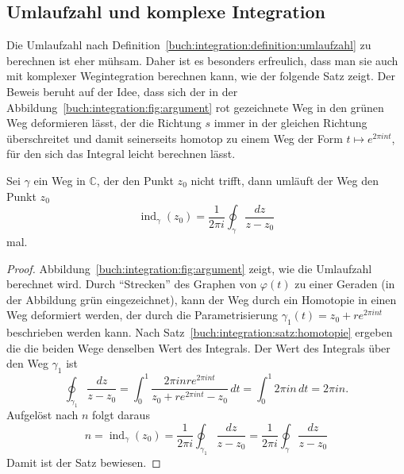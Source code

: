 %
%
%
\subsection{Umlaufzahl und komplexe Integration}
Die Umlaufzahl 
nach Definition~\ref{buch:integration:definition:umlaufzahl}
zu berechnen ist eher mühsam.
Daher ist es besonders erfreulich, dass man sie auch mit komplexer
Wegintegration berechnen kann, wie der folgende Satz zeigt.
Der Beweis beruht auf der Idee, dass sich der in der
Abbildung~\ref{buch:integration:fig:argument} rot gezeichnete Weg
in den grünen Weg deformieren lässt, der die Richtung $s$ immer in der
gleichen Richtung überschreitet und damit seinerseits homotop zu
einem Weg der Form $t\mapsto e^{2\pi int}$, für den sich das Integral
leicht berechnen lässt.

\begin{satz}
Sei $\gamma$ ein Weg in $\mathbb{C}$, der den Punkt $z_0$ nicht trifft,
dann umläuft der Weg den Punkt $z_0$
\[
\operatorname{ind}_\gamma(z_0)
=
\frac{1}{2\pi i}
\oint_\gamma \frac{dz}{z-z_0}
\]
mal.
\end{satz}

\begin{proof}
Abbildung~\ref{buch:integration:fig:argument} zeigt, wie die Umlaufzahl
berechnet wird.
Durch ``Strecken'' des Graphen von $\varphi(t)$ zu einer Geraden
(in der Abbildung grün eingezeichnet), kann der Weg durch ein
Homotopie in einen Weg deformiert werden, der durch  die
Parametrisierung $\gamma_1(t) = z_0+re^{2\pi i n t}$ beschrieben werden kann.
Nach Satz~\ref{buch:integration:satz:homotopie} ergeben die
die beiden Wege denselben Wert des Integrals.
Der Wert des Integrals über den Weg $\gamma_1$ ist
\[
\oint_{\gamma_1}
\frac{dz}{z-z_0}
=
\int_0^1
\frac{2\pi i nre^{2\pi int}}{z_0+re^{2\pi i nt}-z_0}
\,dt
=
\int_0^1
2\pi i n
\,dt
=
2\pi i n.
\]
Aufgelöst nach $n$ folgt daraus
\[
n
=
\operatorname{ind}_\gamma(z_0)
=
\frac{1}{2\pi i}
\oint_{\gamma_1}\frac{dz}{z-z_0}
=
\frac{1}{2\pi i}
\oint_{\gamma}\frac{dz}{z-z_0}
\]
Damit ist der Satz bewiesen.
\end{proof}
